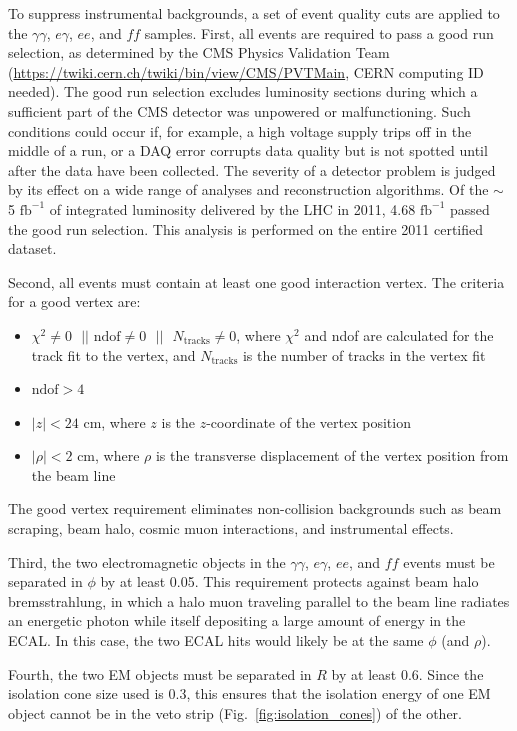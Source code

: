 \documentclass[dissertation.tex]{subfiles}
\begin{document}
To suppress instrumental backgrounds, a set of event quality cuts are applied to the $\gamma\gamma$, $e\gamma$, $ee$, and $\mathit{ff}$ samples.  First, all events are required to pass a good run selection, as determined by the CMS Physics Validation Team (\url{https://twiki.cern.ch/twiki/bin/view/CMS/PVTMain}, CERN computing ID needed).  The good run selection excludes luminosity sections during which a sufficient part of the CMS detector was unpowered or malfunctioning.  Such conditions could occur if, for example, a high voltage supply trips off in the middle of a run, or a DAQ error corrupts data quality but is not spotted until after the data have been collected.  The severity of a detector problem is judged by its effect on a wide range of analyses and reconstruction algorithms.  Of the $\sim$ 5 $\mbox{fb}^{-1}$ of integrated luminosity delivered by the LHC in 2011, 4.68 $\mbox{fb}^{-1}$ passed the good run selection.  This analysis is performed on the entire 2011 certified dataset.

Second, all events must contain at least one good interaction vertex.  The criteria for a good vertex are:

\begin{itemize}
\item $\chi^{2} \neq 0\mbox{ }||\mbox{ ndof} \neq 0\mbox{ }||\mbox{ }N_{\mathrm{tracks}} \neq 0$, where $\chi^{2}$ and ndof are calculated for the track fit to the vertex, and $N_{\mathrm{tracks}}$ is the number of tracks in the vertex fit
\item $\mbox{ndof} > 4$
\item $|z| < 24$ cm, where $z$ is the $z$-coordinate of the vertex position
\item $|\rho| < 2$ cm, where $\rho$ is the transverse displacement of the vertex position from the beam line
\end{itemize}
%
The good vertex requirement eliminates non-collision backgrounds such as beam scraping, beam halo, cosmic muon interactions, and instrumental effects.

Third, the two electromagnetic objects in the $\gamma\gamma$, $e\gamma$, $ee$, and $\mathit{ff}$ events must be separated in $\phi$ by at least 0.05.  This requirement protects against beam halo bremsstrahlung, in which a halo muon traveling parallel to the beam line radiates an energetic photon while itself depositing a large amount of energy in the ECAL.  In this case, the two ECAL hits would likely be at the same $\phi$ (and $\rho$).

Fourth, the two EM objects must be separated in $R$ by at least 0.6.  Since the isolation cone size used is 0.3, this ensures that the isolation energy of one EM object cannot be in the veto strip (Fig.~\ref{fig:isolation_cones}) of the other.
\end{document}
